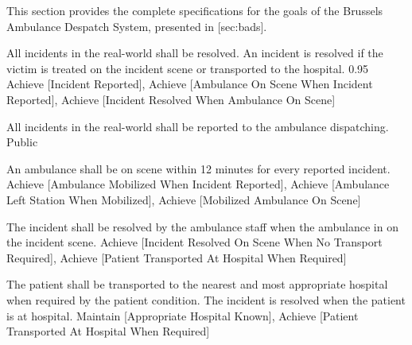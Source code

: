 
\startsubsection[title={Goal specifications}]

  This section provides the complete specifications for the goals of the
  Brussels Ambulance Despatch System, presented in [sec:bads].


    {}

  \startkaosspec
  	 {All incidents in the real-world shall be resolved. An incident is resolved if the victim is treated on the incident scene or transported to the hospital.}
  	 {0.95}
  	 {Achieve [Incident Reported], Achieve [Ambulance On Scene When Incident Reported], Achieve [Incident Resolved When Ambulance On Scene]}
  \stopkaosspec
  
  \startkaosspec
  	 {All incidents in the real-world shall be reported to the ambulance dispatching.}
  	 {Public}
  \stopkaosspec

  \startkaosspec
  	 {An ambulance shall be on scene within 12 minutes for every reported incident.}
  	 {Achieve [Ambulance Mobilized When Incident Reported], Achieve [Ambulance Left Station When Mobilized], Achieve [Mobilized Ambulance On Scene]}
  \stopkaosspec

  \startkaosspec
  	 {The incident shall be resolved by the ambulance staff when the ambulance in on the incident scene.}
  	 {Achieve [Incident Resolved On Scene When No Transport Required], Achieve [Patient Transported At Hospital When Required]}
  \stopkaosspec
  
  
    {}

  \startkaosspec
  	 {The patient shall be transported to the nearest and most appropriate hospital when required by the patient condition. The incident is resolved when the patient is at hospital.}
  	 {Maintain [Appropriate Hospital Known], Achieve [Patient Transported At Hospital When Required]}
  \stopkaosspec


